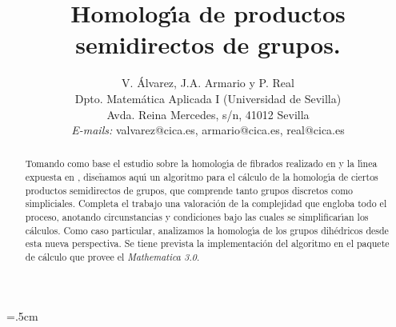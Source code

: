 \title{\LARGE \bf Homolog\'{\i}a de productos semidirectos de grupos.}
\author{\small V. \'{A}lvarez, J.A. Armario y P. Real\\
\small Dpto. Matem\'{a}tica Aplicada I (Universidad de Sevilla)\\
\small Avda. Reina Mercedes, s/n, 41012 Sevilla \\
\small  {\em E-mails:} valvarez@cica.es, armario@cica.es, real@cica.es}
\date{}
\textheight=615pt
\textwidth=425pt
\oddsidemargin=0pt
\headheight=0pt
\headsep=7pt
\hoffset=0pt
\voffset=0pt
\topmargin=10pt
\marginparsep=10pt
\marginparwidth=30pt
\footheight=10pt
\footskip=40pt
\parskip=.5cm
\setlength{\baselineskip}{8ex}
\newcommand{\ra}{\rightarrow}
\newcommand{\la}{\leftarrow}
\newcommand{\scst}{\scriptscriptstyle}
\newcommand{\ot}{\otimes}
\newcommand{\Z}{{\Bbb Z}}
\newcommand{\Zp}{{\Bbb Z}_p}
\newcommand{\pa}{\partial}
\newcommand{\Fp}{{\Bbb F}_p}
\newcommand{\Fr}{{\Bbb F}_2}
\newcommand{\n}{{\tilde{\mbox{n}}}}
\newtheorem{prp}{Proposici\'{o}n}[section]
\newtheorem{lmm}[prp]{Lema}
\newtheorem{thr}[prp]{Teorema}
\newtheorem{dfn}[prp]{Definici\'{o}n}
\newtheorem{rmk}[prp]{Nota}
\newtheorem{crl}[prp]{Corolario}
\newtheorem{ejemplo}[prp]{Ejemplo}
\newtheorem{notacion}[prp]{Notaci\'{o}n}


\sloppy
\maketitle
\vspace{0.5cm}


\begin{abstract}
Tomando como base el estudio sobre la homolog\'{\i}a de fibrados realizado en \cite{LS87}
y la l\'{\i}nea expuesta en \cite{AAR98},
dise$\n$amos aqu\'{\i} un algoritmo para el c\'{a}lculo de la homolog\'{\i}a de ciertos
productos semidirectos de grupos, que comprende tanto grupos discretos como simpliciales.
Completa el trabajo una valoraci\'{o}n de la complejidad que engloba
todo el proceso, anotando circunstancias y condiciones bajo las cuales se
simplificar\'{\i}an los c\'{a}lculos. Como caso particular, analizamos la
homolog\'{\i}a de los grupos dih\'{e}dricos desde esta nueva
perspectiva. Se tiene prevista la implementaci\'{o}n del algoritmo en
el paquete de c\'{a}lculo que provee el {\em Mathematica 3.0}.
\end{abstract}

